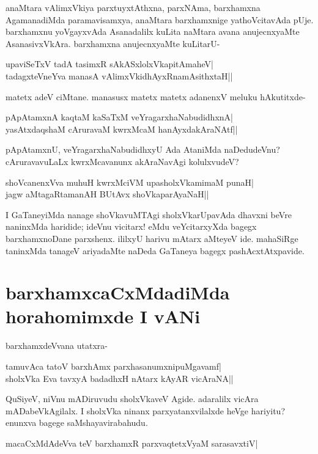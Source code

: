 anaMtara vAlimxVkiya parxtuyxtAthxna, parxNAma, barxhamxna AgamanadiMda paramavisamxya, anaMtara barxhamxnige yathoVcitavAda pUje. barxhamxnu yoVgayxvAda Asanadalilx kuLita naMtara avana anujecnxyaMte AsanasivxVkAra. barxhamxna anujecnxyaMte kuLitarU- 

\begin{shloka} 
upaviSeTxV tadA tasimxR sAkASxlolxVkapitAmaheV|\label{203}\\ 
tadagxteVneYva manasA vAlimxVkidhAyxRnamAsithxtaH||
\end{shloka}
matetx adeV ciMtane. manasusx matetx matetx adanenxV meluku hAkutitxde- 

\begin{shloka}
pApAtamxnA kaqtaM kaSaTxM veYragarxhaNabudidhxnA|\label{203a}\\ 
yasAtxdaqshaM cAruravaM kwrxMcaM hanAyxdakAraNAtf||
\end{shloka}

pApAtamxnU, veYragarxhaNabudidhxyU Ada AtaniMda naDedudeVnu? cAruravavuLaLx kwrxMcavanunx akAraNavAgi kolulxvudeV? 

\begin{shloka}
shoVcanenxVva muhuH kwrxMciVM upasholxVkamimaM punaH|\label{203c}\\
jagw aMtagaRtamanAH BUtAvx shoVkaparAyaNaH||
\end{shloka}

I GaTaneyiMda nanage shoVkavuMTAgi sholxVkarUpavAda dhavxni beVre naninxMda haridide; ideVnu vicitarx! eMdu veYcitarxyXda bagegx barxhamxnoDane parxshenx. ililxyU harivu mAtarx aMteyeV ide. mahaSiRge taninxMda tanageV ariyadaMte naDeda GaTaneya bagegx pashAcxtAtxpavide. 

\section*{barxhamxcaCxMdadiMda horahomimxde I vANi} 

barxhamxdeVvana utatxra- 

\begin{shloka}
tamuvAca tatoV barxhAmx parxhasanumxnipuMgavamf|\label{203d}\\ 
sholxVka Eva tavxyA badadhxH nAtarx kAyAR vicAraNA||
\end{shloka}

QuSiyeV, niVnu mADiruvudu sholxVkaveV Agide. adaralilx vicAra mADabeVkAgilalx. I sholxVka ninanx parxyatanxvilalxde heVge hariyitu? enunxva bagege saMshayavirabahudu. 

\begin{shloka}
macaCxMdAdeVva teV barxhamxR parxvaqtetxVyaM sarasavxtiV|\label{203b}
\end{shloka}

